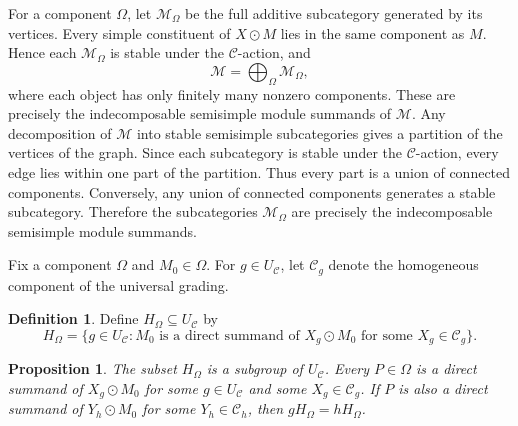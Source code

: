 \documentclass[11pt]{amsart}
\newcommand{\C}{\mathcal C}
\newcommand{\M}{\mathcal M}
\newtheorem{proposition}[theorem]{Proposition}
\theoremstyle{definition}
\newtheorem{definition}[theorem]{Definition}
\theoremstyle{remark}
\theoremstyle{plain}
\begin{document}
For a component $\Omega$, let $\M_\Omega$ be the full additive subcategory generated by its vertices. Every simple constituent of $X\odot M$ lies in the same component as $M$. Hence each $\M_\Omega$ is stable under the $\C$-action, and
\[
\M=\bigoplus_\Omega\M_\Omega,
\]
where each object has only finitely many nonzero components. These are precisely the indecomposable semisimple module summands of $\M$. Any decomposition of $\M$ into stable semisimple subcategories gives a partition of the vertices of the graph. Since each subcategory is stable under the $\C$-action, every edge lies within one part of the partition. Thus every part is a union of connected components. Conversely, any union of connected components generates a stable subcategory. Therefore the subcategories $\M_\Omega$ are precisely the indecomposable semisimple module summands.

Fix a component $\Omega$ and $M_0\in\Omega$. For $g\in U_{\C}$, let $\C_g$ denote the homogeneous component of the universal grading.

\begin{definition}\label{def:component-stabilizer}
Define $H_\Omega\subseteq U_{\C}$ by
\begin{equation}\label{eq:stabilizer}
H_\Omega=\{g\in U_{\C}:M_0\text{ is a direct summand of }X_g\odot M_0\text{ for some }X_g\in\C_g\}.
\end{equation}
\end{definition}

\begin{proposition}\label{prop:coset-grading}
The subset $H_\Omega$ is a subgroup of $U_{\C}$. Every $P\in\Omega$ is a direct summand of $X_g\odot M_0$ for some $g\in U_{\C}$ and some $X_g\in\C_g$. If $P$ is also a direct summand of $Y_h\odot M_0$ for some $Y_h\in\C_h$, then $gH_\Omega=hH_\Omega$.
\end{proposition}
\end{document}
